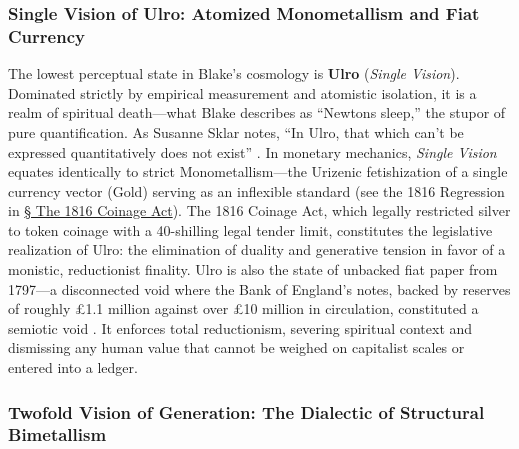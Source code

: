 \documentclass[
]{article}
\begin{document}
\subsubsection{Single Vision of Ulro: Atomized Monometallism and Fiat
Currency}\label{single-vision-of-ulro-atomized-monometallism-and-fiat-currency}

The lowest perceptual state in Blake's cosmology is \textbf{Ulro}
(\emph{Single Vision}). Dominated strictly by empirical measurement and
atomistic isolation, it is a realm of spiritual death---what Blake
describes as ``Newtons sleep,'' the stupor of pure quantification. As
Susanne Sklar notes, ``In Ulro, that which can't be expressed
quantitatively does not exist'' \citep{sklar2011blake}. In monetary
mechanics, \emph{Single Vision} equates identically to strict
Monometallism---the Urizenic fetishization of a single currency vector
(Gold) serving as an inflexible standard (see the 1816 Regression in
\hyperref[sec-coinage-act-1816]{§ The 1816 Coinage Act}). The 1816
Coinage Act, which legally restricted silver to token coinage with a
40-shilling legal tender limit, constitutes the legislative realization
of Ulro: the elimination of duality and generative tension in favor of a
monistic, reductionist finality. Ulro is also the state of unbacked fiat
paper from 1797---a disconnected void where the Bank of England's notes,
backed by reserves of roughly £1.1 million against over £10 million in
circulation, constituted a semiotic void \citep{clapham1944bank}. It
enforces total reductionism, severing spiritual context and dismissing
any human value that cannot be weighed on capitalist scales or entered
into a ledger.

\subsubsection{Twofold Vision of Generation: The Dialectic of Structural
Bimetallism}\label{twofold-vision-of-generation-the-dialectic-of-structural-bimetallism}
\end{document}
